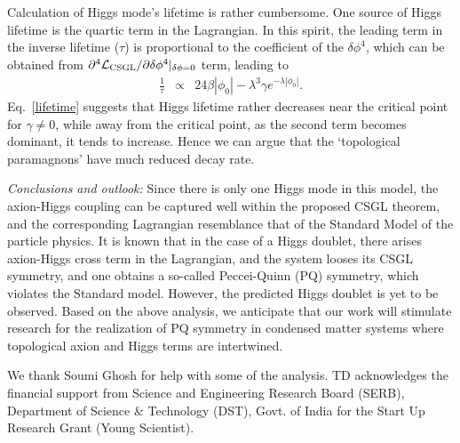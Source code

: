 \documentclass[aps,prl,showpacs,twocolumn,groupedaddress]{revtex4-1}
\begin{document}
Calculation of Higgs mode's lifetime is rather cumbersome. One source of Higgs lifetime is the quartic term in the Lagrangian. In this spirit, the leading term in the inverse lifetime ($\tau$) is proportional to the coefficient of the $\delta\phi^4$, which can be obtained from $\partial^4 \mathcal{L}_{\rm CSGL}/\partial \delta \phi^4|_{\delta \phi=0}$ term, leading to
{
\begin{eqnarray}
\frac{1}{\tau}&\propto& 24 \beta|\phi_0|-\lambda^3\gamma e^{-\lambda|\phi_0|}.
\label{lifetime}
\end{eqnarray}
}
Eq.~\eqref{lifetime} suggests that Higgs lifetime rather decreases near the critical point for $\gamma\ne 0$, while away from the critical point, as the second term becomes dominant, it tends to increase. Hence we can argue that the `topological paramagnons' have much reduced decay rate.

{\it Conclusions and outlook:} Since there is only one Higgs mode in this model, the axion-Higgs  coupling can be captured well within the proposed CSGL theorem, and the corresponding Lagrangian resemblance that of the Standard Model of the particle physics. It is known that in the case of a Higgs doublet, there arises axion-Higgs cross term in the Lagrangian, and the system looses its CSGL symmetry, and one obtains a so-called Peccei-Quinn (PQ) symmetry, which violates the Standard model.\cite{Axiondoublet} However, the predicted Higgs doublet is yet to be observed. Based on the above analysis, we anticipate that our work will stimulate research for the realization of PQ symmetry in condensed matter systems where topological axion and Higgs terms are intertwined.\cite{Axiondoublet}

\begin{acknowledgments} 
We thank Soumi Ghosh for help with some of the analysis. TD acknowledges the financial support from Science and Engineering Research Board (SERB), Department of Science \& Technology (DST), Govt. of India for the Start Up Research Grant (Young Scientist).
\end{acknowledgments} 

%
\end{document}
